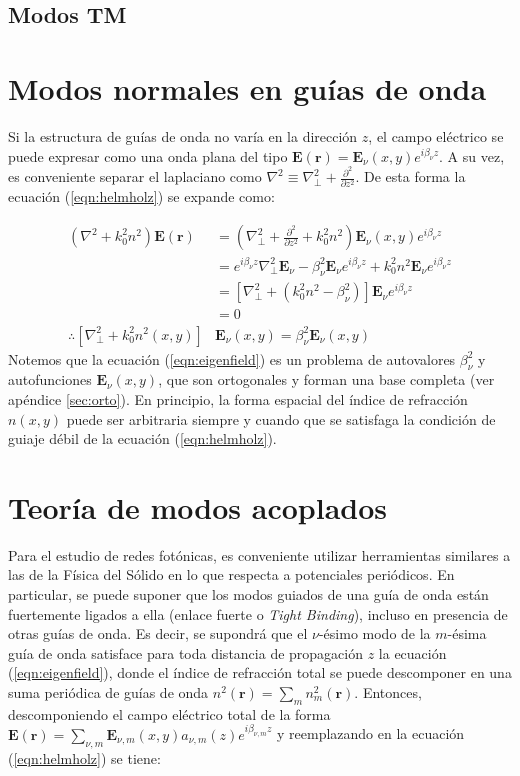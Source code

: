 \subsection{Modos TM}
\section{Modos normales en guías de onda}

Si la estructura de guías de onda no varía en la dirección $z$, el campo eléctrico se puede expresar como una onda plana del tipo $\textbf{E}(\textbf{r}) = \textbf{E}_\nu(x, y) e^{i\beta_\nu z}$. A su vez, es conveniente separar el laplaciano como $\nabla^2 \equiv \nabla_\perp^2 + \frac{\partial^2}{\partial z^2}$. De esta forma la ecuación (\ref{eqn:helmholz}) se expande como:

\begin{align}
	(\nabla^2  + k_0^2n^2) \textbf{E}(\textbf{r}) &= \left(\nabla_\perp^2 + \frac{\partial^2}{\partial z^2} + k_0^2n^2\right) \textbf{E}_\nu(x, y)  e^{i\beta_\nu z} \nonumber
\\	
	&= e^{i\beta_\nu z} \nabla_\perp^2 \textbf{E}_\nu -\beta_\nu^2\textbf{E}_\nu e^{i\beta_\nu z} + k_0^2n^2 \textbf{E}_\nu  e^{i\beta_\nu z}
\nonumber	
	\\	
	&= \left[  \nabla_\perp^2  + (k_0^2n^2-\beta_\nu^2) \right]\textbf{E}_\nu  e^{i\beta_\nu z}
	\nonumber	
	\\
	&=
	0
	\nonumber
	\\
	\therefore
	 \left[  \nabla_\perp^2  + k_0^2n^2(x,y) \right]&\textbf{E}_\nu(x,y)  = \beta_\nu^2 \textbf{E}_\nu(x,y) \label{eqn:eigenfield}
\end{align}
Notemos que la ecuación (\ref{eqn:eigenfield}) es un problema de autovalores $\beta_\nu^2$ y autofunciones $\textbf{E}_\nu(x,y)$, que son ortogonales y forman una base completa (ver apéndice \ref{sec:orto}). En principio, la forma espacial del índice de refracción $n(x, y)$ puede ser arbitraria siempre y cuando que se satisfaga la condición de guiaje débil de la ecuación (\ref{eqn:helmholz}). 

\section{Teoría de modos acoplados}
	Para el estudio de redes fotónicas, es conveniente utilizar herramientas similares a las de la Física del Sólido en lo que respecta a potenciales periódicos. En particular, se puede suponer que los modos guiados de una guía de onda están fuertemente ligados a ella (enlace fuerte o \textit{Tight Binding}), incluso en presencia de otras guías de onda. Es decir, se supondrá que el $\nu$-ésimo modo de la $m$-ésima guía de onda satisface para toda distancia de propagación $z$ la ecuación (\ref{eqn:eigenfield}), donde el índice de refracción total se puede descomponer en una suma periódica de guías de onda $n^2(\textbf{r}) = \sum_{m} n^2_m(\textbf{r})$. Entonces, descomponiendo el campo eléctrico total de la forma $\textbf{E}(\textbf{r}) = \sum_{\nu, m} \textbf{E}_{\nu, m}(x, y) a_{\nu, m}(z) e^{i\beta_{\nu, m} z}$ y reemplazando en la ecuación (\ref{eqn:helmholz}) se tiene:

